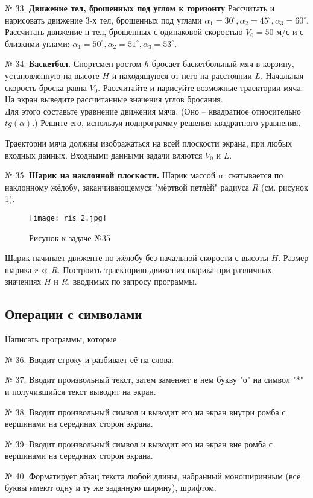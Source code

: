 № 33. {\bf Движение тел, брошенных под углом к горизонту} Рассчитать и нарисовать движение 3-х тел, брошенных под углами $\alpha_1 =30^\circ, \alpha_2 = 45^\circ, \alpha_3 =60^\circ$.  Рассчитать движение $п$ тел, брошенных с одинаковой скоростью   $V_0=50$ м/с  и с близкими углами: $\alpha_1 = 50^\circ, \alpha_2 = 51^\circ, \alpha_3 = 53^\circ$.

№ 34. {\bf Баскетбол.}
Спортсмен ростом $h$ бросает баскетбольный мяч в корзину, установленную на высоте $H$ и находящуюся от него на расстоянии $L$. Начальная скорость броска равна $V_0$. Рассчитайте и нарисуйте возможные траектории мяча. На экран выведите рассчитанные значения углов бросания.\\
Для этого составьте уравнение движения мяча. (Оно -- квадратное относительно $tg(\alpha)$.)  Решите его, используя подпрограмму решения квадратного уравнения.

Траектории мяча должны изображаться на всей плоскости экрана, при любых входных данных. Входными данными задачи  вляются  $V_0$ и $L$.

№ 35. {\bf Шарик на наклонной плоскости.}
Шарик массой m скатывается по наклонному жёлобу, заканчивающемуся "мёртвой петлёй" радиуса $R$ (см. рисунок \ref{ris2}). 
\begin{figure}[!hb]
\centerline{
\texttt{[image: ris\_2.jpg]}}
\caption{Рисунок к задаче №35}
\label{ris2}
\end{figure}
Шарик начинает движенте по жёлобу без начальной скорости с высоты $H$. Размер шарика $r \ll R$. Построить траекторию движения шарика при различных значениях $H$ и $R$. вводимых по запросу программы.

\subsection{Операции с символами}

Написать программы, которые

№ 36. Вводит строку и разбивает её на слова.

№ 37. Вводит произвольный текст, затем заменяет в нем букву "о" на   символ "*" и получившийся текст выводит на экран.

№ 38. Вводит произвольный символ и выводит его на экран внутри ромба с вершинами на серединах сторон экрана.

№ 39. Вводит произвольный символ и выводит его на экран вне ромба с вершинами на серединах сторон экрана.

№ 40. Форматирует абзац текста любой длины, набранный моноширинным (все буквы имеют одну и ту же заданную ширину), шрифтом.

